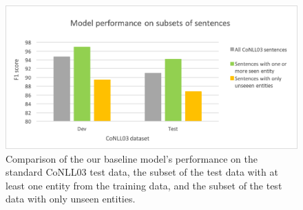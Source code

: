  \begin{table}[h]
    \centering
    \begin{singlespace}
    \scalebox{.7} {
    }
    \end{singlespace}
    \caption{Comparison of the our baseline model's performance on the standard CoNLL03 test data, the subset of the test data with at least one entity from the training data, and the subset of the test data with only unseen entities.}
    \label{tab:seenvsunseen}
\end{table}


\begin{figure}[h]
	\centering
	\includegraphics[width=0.85\linewidth]{LatexDiss/figures/seenvsunseen.png}
	\caption{Comparison of the our baseline model's performance on the standard CoNLL03 test data, the subset of the test data with at least one entity from the training data, and the subset of the test data with only unseen entities.}
	\label{fig:seenvsunseen}
\end{figure}

